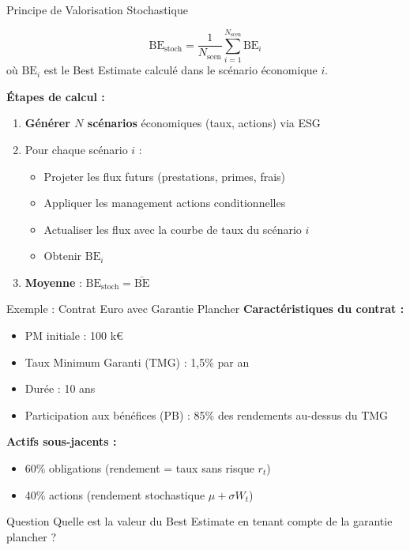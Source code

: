 \documentclass[10pt,aspectratio=169]{beamer}
\newcommand{\BE}{\text{BE}}
\begin{document}
\begin{frame}{Principe de Valorisation Stochastique}
\begin{definition}[BE Stochastique]
\[
\BE_{\text{stoch}} = \frac{1}{N_{\text{scen}}}\sum_{i=1}^{N_{\text{scen}}} \BE_i
\]
où $\BE_i$ est le Best Estimate calculé dans le scénario économique $i$.
\end{definition}

\vspace{0.3cm}
\textbf{Étapes de calcul :}
\begin{enumerate}
    \item \textbf{Générer $N$ scénarios} économiques (taux, actions) via ESG
    \item Pour chaque scénario $i$ :
    \begin{itemize}
        \item Projeter les flux futurs (prestations, primes, frais)
        \item Appliquer les management actions conditionnelles
        \item Actualiser les flux avec la courbe de taux du scénario $i$
        \item Obtenir $\BE_i$
    \end{itemize}
    \item \textbf{Moyenne} : $\BE_{\text{stoch}} = \bar{\BE}$
\end{enumerate}
\end{frame}

\begin{frame}{Exemple : Contrat Euro avec Garantie Plancher}
\textbf{Caractéristiques du contrat :}
\begin{itemize}
    \item PM initiale : 100 k€
    \item Taux Minimum Garanti (TMG) : 1,5\% par an
    \item Durée : 10 ans
    \item Participation aux bénéfices (PB) : 85\% des rendements au-dessus du TMG
\end{itemize}

\vspace{0.3cm}
\textbf{Actifs sous-jacents :}
\begin{itemize}
    \item 60\% obligations (rendement = taux sans risque $r_t$)
    \item 40\% actions (rendement stochastique $\mu + \sigma W_t$)
\end{itemize}

\vspace{0.3cm}
\begin{alertblock}{Question}
Quelle est la valeur du Best Estimate en tenant compte de la garantie plancher ?
\end{alertblock}
\end{frame}
\end{document}

